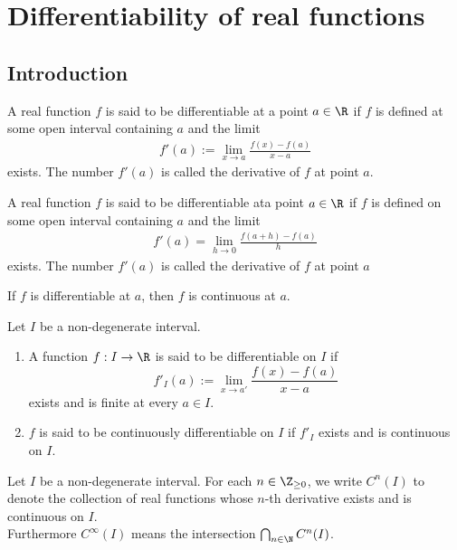 \documentclass{article}
\begin{document}
\section{Differentiability of real functions}


\subsection{Introduction}

\begin{definition}[Ross, 28.1]
	A real function $f$ is said to be differentiable at a
	point $a\in\R$ if $f$ is defined at some open interval containing
	$a$ and the limit
	\begin{align*}
		f'(a) := \lim_{x\to a}\frac{f(x)-f(a)}{x-a}
	\end{align*}
	exists. The number $f'(a)$ is called the derivative of $f$
	at point $a$.
\end{definition}

\begin{definition}
	A real function $f$ is said to be differentiable ata point $a\in\R$
	if $f$ is defined on some open interval containing $a$ and the
	limit
	\begin{align*}
		f'(a)=\lim_{h\to 0}\frac{f(a+h)-f(a)}{h}
	\end{align*}
	exists. The number $f'(a)$ is called the derivative of $f$
	at point $a$
\end{definition}

\begin{theorem}[Ross, 28.2]
	If $f$ is differentiable at $a$, then $f$ is continuous at $a$.
\end{theorem}

\begin{definition}
	Let $I$ be a non-degenerate interval.
	\begin{enumerate}[label=(\arabic*)]
		\item A function $f:I\to\R$ is said to be differentiable on $I$
		      if \[f'_I(a):= \lim_{x\to a'}\frac{f(x)-f(a)}{x-a}\] exists and is
		      finite at every $a\in I$.
		\item $f$ is said to be continuously differentiable on $I$ if $f'_I$
		      exists and is continuous on $I$.
	\end{enumerate}
\end{definition}

\begin{definition*}
	Let $I$ be a non-degenerate interval. For each $n\in\Z_{\geq 0}$, we write
	$C^n(I)$ to denote the collection of real functions whose $n$-th derivative
	exists and is continuous on $I$.\\
	\indent
	Furthermore $C^\infty(I)$ means the intersection $\bigcap_{n\in\N}C^n(I)$.
\end{definition*}
\end{document}
